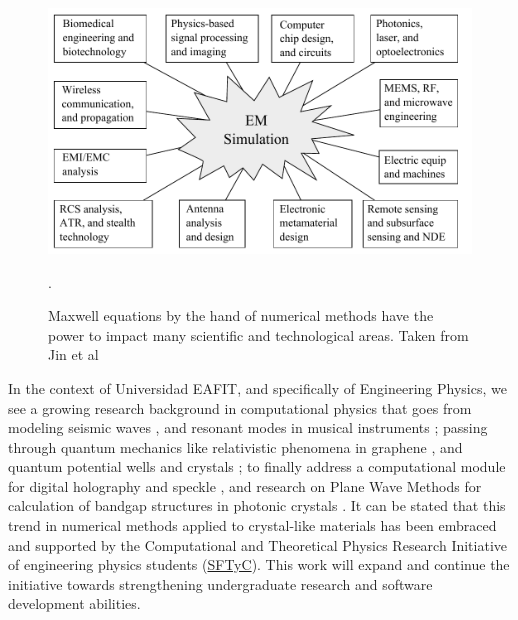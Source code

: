\begin{figure}[h]
\centering
\includegraphics[scale=0.5]{./img/EM_simulation_applications.pdf}
\caption{Maxwell equations by the hand of numerical methods have the power to impact many scientific and technological areas. Taken from Jin et al \cite{Jin2010}}.
\label{fig:simulation_areas}
\end{figure}

In the context of Universidad EAFIT, and specifically of Engineering Physics, we see a growing research background in computational physics that goes from modeling seismic waves \cite{Guarin2012}, and resonant modes in musical instruments \cite{Rodriguez2012}; passing through quantum mechanics like relativistic phenomena in graphene \cite{Villegas2011}, and quantum potential wells and crystals \cite{Echeverri2011}; to finally address a computational module for digital holography and speckle \cite{Sierra2010}, and research on Plane Wave Methods for calculation of bandgap structures in photonic crystals \cite{Loaiza2011}. It can be stated that this trend in numerical methods applied to crystal-like materials has been embraced and supported by the Computational and Theoretical Physics Research Initiative of engineering physics students (\href{https://sites.google.com/site/fisicatyc/home}{SFTyC}). This work will expand and continue the initiative towards strengthening undergraduate research and software development abilities. 



\pagebreak